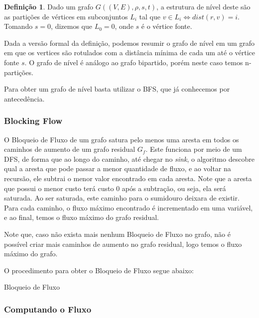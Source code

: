 \documentclass[
	12pt,
	a4paper,
	onepage,
	brazil
]{article}
\theoremstyle{definition}
\newtheorem{definition}{Definição}
\begin{document}
	\begin{definition}
	\label{level-graph-def}
	Dado um grafo $G((V,E), \rho, s, t)$, a estrutura de nível deste são as partições de vértices em subconjuntos $L_i$ tal que $v \in L_i \iff dist(r,v) = i$. Tomando $s=0$, dizemos que $L_0={0}$, onde $s$ é o vértice fonte.
	\end{definition}
	
	Dada a versão formal da definição, podemos resumir o grafo de nível em um grafo em que os vertices são rotulados com a distância mínima de cada um até o vértice fonte $s$. O grafo de nível é análogo ao grafo bipartido, porém neste caso temos n-partições.
	
	Para obter um grafo de nível basta utilizar o BFS, que já conhecemos por antecedência.
	
	\subsubsection{Blocking Flow}
	
	O Bloqueio de Fluxo de um grafo satura pelo menos uma aresta em todos os caminhos de aumento de um grafo residual $G_f$. Este funciona por meio de um DFS, de forma que ao longo do caminho, até chegar no \textit{sink}, o algoritmo descobre qual a aresta que pode passar a menor quantidade de fluxo, e ao voltar na recursão, ele subtrai o menor valor encontrado em cada aresta. Note que a aresta que possui o menor custo terá custo $0$ após a subtração, ou seja, ela será saturada. Ao ser saturada, este caminho para o sumidouro deixara de existir. Para cada caminho, o fluxo máximo encontrado é incrementado em uma variável, e ao final, temos o fluxo máximo do grafo residual.
	
	Note que, caso não exista mais nenhum Bloqueio de Fluxo no grafo, não é possível criar mais caminhos de aumento no grafo residual, logo temos o fluxo máximo do grafo.
	
	O procedimento para obter o Bloqueio de Fluxo segue abaixo:
	
	\begin{algorithm}
	\SetAlgoLined
	
	
	\caption{Bloqueio de Fluxo}
	\end{algorithm}
	
	\subsubsection{Computando o Fluxo}
	
\end{document}
